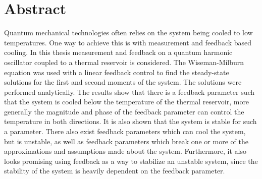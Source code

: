 \section*{\centering Abstract}
Quantum mechanical technologies often relies on the system being cooled to low temperatures. One way to achieve this is with measurement and feedback based cooling. In this thesis measurement and feedback on a quantum harmonic oscillator coupled to a thermal reservoir is considered. The Wiseman-Milburn equation \cite{Annby-Andersson:2024} was used with a linear feedback control to find the steady-state solutions for the first and second moments of the system. The solutions were performed analytically. The results show that there is a feedback parameter such that the system is cooled below the temperature of the thermal reservoir, more generally the magnitude and phase of the feedback parameter can control the temperature in both directions. It is also shown that the system is stable for such a parameter. There also exist feedback parameters which can cool the system, but is unstable, as well as feedback parameters which break one or more of the approximations and assumptions made about the system. Furthermore, it also looks promising using feedback as a way to stabilize an unstable system, since the stability of the system is heavily dependent on the feedback parameter.